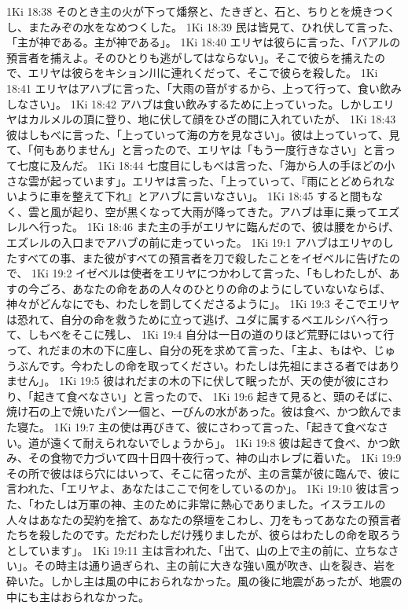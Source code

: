 1Ki 18:38  そのとき主の火が下って燔祭と、たきぎと、石と、ちりとを焼きつくし、またみぞの水をなめつくした。
1Ki 18:39  民は皆見て、ひれ伏して言った、「主が神である。主が神である」。
1Ki 18:40  エリヤは彼らに言った、「バアルの預言者を捕えよ。そのひとりも逃がしてはならない」。そこで彼らを捕えたので、エリヤは彼らをキション川に連れくだって、そこで彼らを殺した。
1Ki 18:41  エリヤはアハブに言った、「大雨の音がするから、上って行って、食い飲みしなさい」。
1Ki 18:42  アハブは食い飲みするために上っていった。しかしエリヤはカルメルの頂に登り、地に伏して顔をひざの間に入れていたが、
1Ki 18:43  彼はしもべに言った、「上っていって海の方を見なさい」。彼は上っていって、見て、「何もありません」と言ったので、エリヤは「もう一度行きなさい」と言って七度に及んだ。
1Ki 18:44  七度目にしもべは言った、「海から人の手ほどの小さな雲が起っています」。エリヤは言った、「上っていって、『雨にとどめられないように車を整えて下れ』とアハブに言いなさい」。
1Ki 18:45  すると間もなく、雲と風が起り、空が黒くなって大雨が降ってきた。アハブは車に乗ってエズレルへ行った。
1Ki 18:46  また主の手がエリヤに臨んだので、彼は腰をからげ、エズレルの入口までアハブの前に走っていった。
1Ki 19:1  アハブはエリヤのしたすべての事、また彼がすべての預言者を刀で殺したことをイゼベルに告げたので、
1Ki 19:2  イゼベルは使者をエリヤにつかわして言った、「もしわたしが、あすの今ごろ、あなたの命をあの人々のひとりの命のようにしていないならば、神々がどんなにでも、わたしを罰してくださるように」。
1Ki 19:3  そこでエリヤは恐れて、自分の命を救うために立って逃げ、ユダに属するベエルシバへ行って、しもべをそこに残し、
1Ki 19:4  自分は一日の道のりほど荒野にはいって行って、れだまの木の下に座し、自分の死を求めて言った、「主よ、もはや、じゅうぶんです。今わたしの命を取ってください。わたしは先祖にまさる者ではありません」。
1Ki 19:5  彼はれだまの木の下に伏して眠ったが、天の使が彼にさわり、「起きて食べなさい」と言ったので、
1Ki 19:6  起きて見ると、頭のそばに、焼け石の上で焼いたパン一個と、一びんの水があった。彼は食べ、かつ飲んでまた寝た。
1Ki 19:7  主の使は再びきて、彼にさわって言った、「起きて食べなさい。道が遠くて耐えられないでしょうから」。
1Ki 19:8  彼は起きて食べ、かつ飲み、その食物で力づいて四十日四十夜行って、神の山ホレブに着いた。
1Ki 19:9  その所で彼はほら穴にはいって、そこに宿ったが、主の言葉が彼に臨んで、彼に言われた、「エリヤよ、あなたはここで何をしているのか」。
1Ki 19:10  彼は言った、「わたしは万軍の神、主のために非常に熱心でありました。イスラエルの人々はあなたの契約を捨て、あなたの祭壇をこわし、刀をもってあなたの預言者たちを殺したのです。ただわたしだけ残りましたが、彼らはわたしの命を取ろうとしています」。
1Ki 19:11  主は言われた、「出て、山の上で主の前に、立ちなさい」。その時主は通り過ぎられ、主の前に大きな強い風が吹き、山を裂き、岩を砕いた。しかし主は風の中におられなかった。風の後に地震があったが、地震の中にも主はおられなかった。
